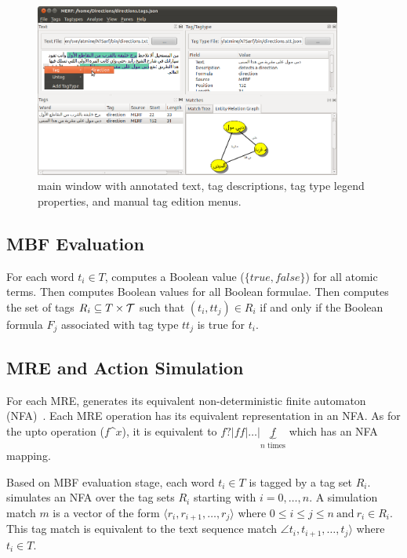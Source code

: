 \begin{figure}[t]
  \centering
  \includegraphics[width=0.9\textwidth]{figures/tagger}
  \caption{\framework main window with annotated text, tag descriptions, tag type legend properties, and manual tag edition menus. }
  \label{f:tagger}
\end{figure}

\subsection{MBF Evaluation}
For each word $t_i \in T$, \framework computes a Boolean value 
($\{\mathit{true}, \mathit{false}\}$)
for all atomic terms. 
Then \framework computes Boolean values for all Boolean formulae. 
Then \framework computes the set of tags 
$R_i\subseteq T \times {\cal T}$  such that 
$(t_i,\mathit{tt}_j) \in R_i$ if and only if the Boolean formula $F_j$ associated with
tag type $\mathit{tt}_j$ is true for $t_i$. 

\subsection{MRE and Action Simulation}
For each MRE, 
\framework generates its equivalent non-deterministic finite automaton (NFA)~\cite{sipser2006introduction}. 
Each MRE operation has its equivalent representation in an NFA. 
As for the upto operation ($f$\textasciicircum$x$), 
it is equivalent to $f?|ff|\dots|\underbrace{f}_{n \text{ times}}$ which has an NFA mapping. 

Based on MBF evaluation stage, each word $t_i \in T$ is tagged by a tag set $R_i$. 
\framework simulates an NFA over the tag sets $R_i$ starting with $i=0,\dots,n$. 
A simulation match $m$ is a vector of the form $\langle r_i,r_{i+1},\dots,r_j\rangle$ where $0\le i\le j\le n~\text{and}~r_i\in R_i$. 
This tag match is equivalent to the text sequence match $\angle t_i,t_{i+1},\dots,t_j\rangle$ where $t_i\in T$. 

